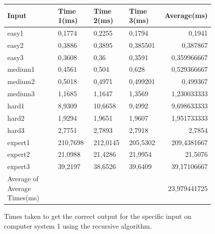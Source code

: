 \documentclass[11pt]{article}
\begin{document}
\begin{figure}[H]
\centering
\begin{tabular}{|l|l|l|l|r|}
\hline
Input & Time 1(ms) & Time 2(ms) & Time 3(ms) & Average(ms)\\
\hline
easy1	 & 0,1774& 0,2255&	0,1794&	0,1941\\
easy2	&0,3886&	0,3895&	0,385501 &0,387867\\
easy3	&0,3608&	0,36&	0,3591	&0,359966667\\
medium1	&0,4561&	0,504&	0,628	&0,529366667\\
medium2	&0,5018&	0,4971&	0,499201	&0,499367\\
medium3	&1,1685&	1,1647&	1,3569	&1,230033333\\
hard1	&8,9309&	10,6658&	9,4992&	9,698633333\\
hard2	&1,9294&	1,9651&	1,9607&	1,951733333\\
hard3	&2,7751&	2,7893&	2,7918&	2,7854\\
expert1	&210,7698 &	212,0145&	205,5302&	209,4381667\\
expert2	&21,0988 &	21,4286&	21,9954& 21,5076\\
expert3	&39,2197& 38,6526& 39,6409& 39,17106667\\
\hline
Average of Average Times(ms) & & & &23,979441725\\
\hline
\end{tabular}
\caption{Times taken to get the correct output for the specific input on computer system 1 using the recursive algorithm.}
\end{figure}
\end{document}
